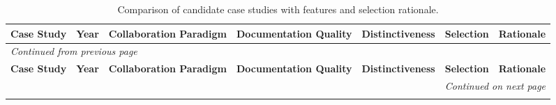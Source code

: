 \documentclass[a4paper, 12pt]{article}
\begin{document}
\begin{landscape}
\begin{longtable}{p{2.5cm} p{1cm} p{3.5cm} p{3cm} p{3cm} p{2cm} p{6.8cm}}
    \caption{Comparison of candidate case studies with features and selection rationale.} \label{tab:casestudycomparison} \\
    \toprule
    \textbf{Case Study} & \textbf{Year} & \textbf{Collaboration Paradigm} & \textbf{Documentation Quality} & \textbf{Distinctiveness} & \textbf{Selection} & \textbf{Rationale} \\
    \midrule
    \endfirsthead
    \multicolumn{7}{l}{\textit{Continued from previous page}} \\
    \toprule
    \textbf{Case Study} & \textbf{Year} & \textbf{Collaboration Paradigm} & \textbf{Documentation Quality} & \textbf{Distinctiveness} & \textbf{Selection} & \textbf{Rationale} \\
    \midrule
    \endhead
    \midrule
    \multicolumn{7}{r}{\textit{Continued on next page}} \\
    \endfoot
    \bottomrule
    \endlastfoot


\end{longtable}
\end{landscape}
\end{document}
